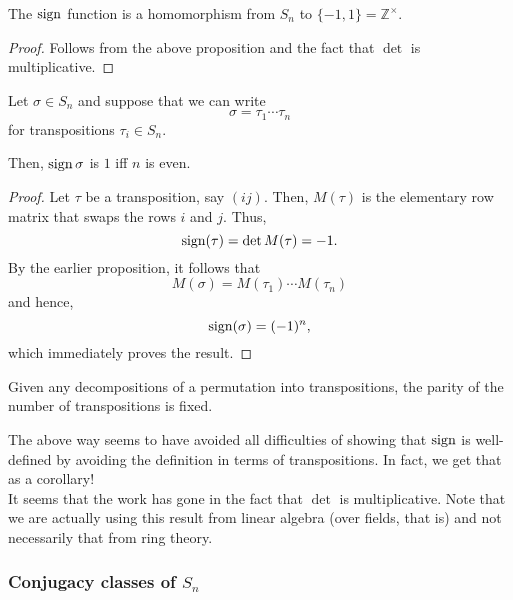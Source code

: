 \begin{cor} \label{cor:signisahomo}
	The $\operatorname{sign}$ function is a homomorphism from $S_n$ to $\{-1, 1\} = \mathbb{Z}^\times.$
\end{cor}
\begin{proof} 
	Follows from the above proposition and the fact that $\det$ is multiplicative.
\end{proof}

\begin{prop}
	Let $\sigma \in S_n$ and suppose that we can write
	\begin{equation*} 
		\sigma = \tau_1\cdots\tau_n
	\end{equation*}
	for transpositions $\tau_i \in S_n.$

	Then, $\operatorname{sign}\sigma$ is $1$ iff $n$ is even.
\end{prop}
\begin{proof} 
	Let $\tau$ be a transposition, say $(ij).$ Then, $M(\tau)$ is the elementary row matrix that swaps the rows $i$ and $j.$ Thus, 
	\begin{equation*} 
		\operatorname{sign}(\tau) = \det M(\tau) = -1.
	\end{equation*} By the earlier proposition, it follows that
	\begin{equation*} 
		M(\sigma) = M(\tau_1)\cdots M(\tau_n)
	\end{equation*}
	and hence,
	\begin{equation*} 
		\operatorname{sign}(\sigma) = (-1)^n,
	\end{equation*}
	which immediately proves the result.
\end{proof}

\begin{cor}
	Given any decompositions of a permutation into transpositions, the parity of the number of transpositions is fixed.
\end{cor}

\begin{rem}
	The above way seems to have avoided all difficulties of showing that $\operatorname{sign}$ is well-defined by avoiding the definition in terms of transpositions. In fact, we get that as a corollary!\\
	It seems that the work has gone in the fact that $\det$ is multiplicative. Note that we are actually using this result from linear algebra (over fields, that is) and not necessarily that from ring theory.
\end{rem}

\subsubsection{Conjugacy classes of \texorpdfstring{$S_n$}{Sn}} \label{subsubsec:conjclassofSn}

